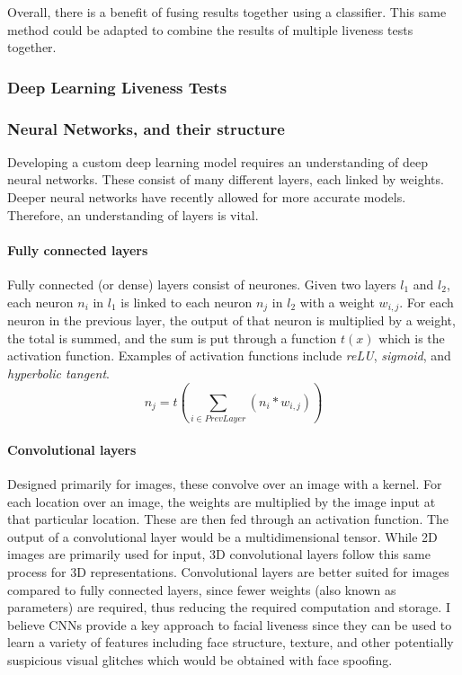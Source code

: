 \documentclass[10pt,a4paper]{article}
\begin{document}
        Overall, there is a benefit of fusing results together using a classifier. This same method could be adapted to combine the results of multiple liveness tests together.

        \subsubsection{Deep Learning Liveness Tests}

        \subsubsection{Neural Networks, and their structure}
        Developing a custom deep learning model requires an understanding of deep neural networks. These consist of many different layers, each linked by weights. Deeper neural networks have recently allowed for more accurate models. Therefore, an understanding of layers is vital.

        \paragraph{Fully connected layers} Fully connected (or dense) layers consist of neurones. Given two layers $l_1$ and $l_2$, each
        neuron $n_i$ in $l_1$ is linked to each neuron $n_j$ in $l_2$ with a weight $w_{i, j}$. For each neuron in the previous layer, the output of that neuron is multiplied by a weight, the total is summed,
        and the sum is put through a function $t(x)$ which is the activation function. Examples of activation functions include \emph{reLU}, \emph{sigmoid}, and \emph{hyperbolic tangent}.
        $$n_j = t(\sum_{i \in PrevLayer}(n_i * w_{i, j}))$$

        \paragraph{Convolutional layers} Designed primarily for images, these convolve over an image with a kernel. For each location over an image, the weights are multiplied by the image input at that particular location. These are then fed through an activation function.
        The output of a convolutional layer would be a multidimensional tensor. While 2D images are primarily used for input, 3D convolutional layers follow this same process for 3D representations. 
        Convolutional layers are better suited for images compared to fully connected layers, since fewer weights (also known as parameters) are required, thus reducing the required computation and storage. I believe CNNs provide a key approach to facial liveness since they can be used to learn a variety of features including face structure,
        texture, and other potentially suspicious visual glitches which would be obtained with face spoofing.
\end{document}
